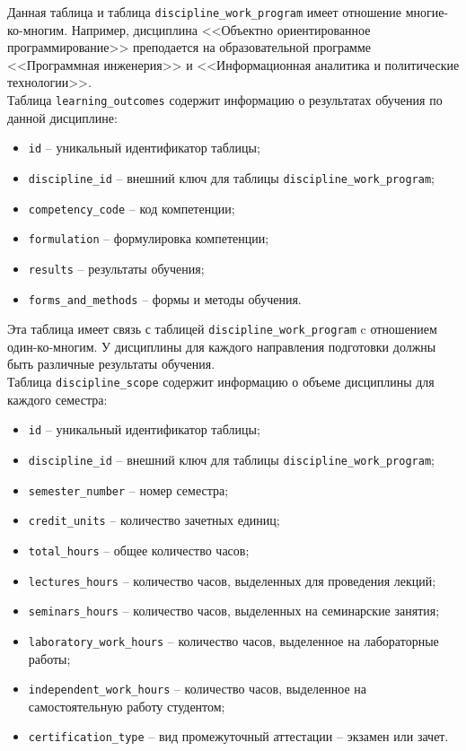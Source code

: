 Данная таблица и таблица \texttt{discipline\_work\_program} имеет отношение многие-ко-многим. Например, дисциплина <<Объектно ориентированное программирование>> преподается на образовательной программе <<Программная инженерия>> и <<Информационная аналитика и политические технологии>>.\\

Таблица \texttt{learning\_outcomes} содержит информацию о результатах обучения по данной дисциплине:

\begin{itemize}
	\item \texttt{id} -- уникальный идентификатор таблицы;
	\item \texttt{discipline\_id} -- внешний ключ для таблицы \texttt{discipline\_work\_program};
	\item \texttt{competency\_code} -- код компетенции;
	\item \texttt{formulation} -- формулировка компетенции;
	\item \texttt{results} -- результаты обучения;
	\item \texttt{forms\_and\_methods} -- формы и методы обучения.
\end{itemize}

Эта таблица имеет связь с таблицей \texttt{discipline\_work\_program} c отношением один-ко-многим. У дисциплины для каждого направления подготовки должны быть различные результаты обучения.\\

Таблица \texttt{discipline\_scope} содержит информацию о объеме дисциплины для каждого семестра:

\begin{itemize}
	\item \texttt{id} -- уникальный идентификатор таблицы;
	\item \texttt{discipline\_id} -- внешний ключ для таблицы \texttt{discipline\_work\_program};
	\item \texttt{semester\_number} -- номер семестра;
	\item \texttt{credit\_units} -- количество зачетных единиц;
	\item \texttt{total\_hours} -- общее количество часов;
	\item \texttt{lectures\_hours} -- количество часов, выделенных для проведения лекций;
	\item \texttt{seminars\_hours} -- количество часов, выделенных на семинарские занятия;
	\item \texttt{laboratory\_work\_hours} -- количество часов, выделенное на лабораторные работы;
	\item \texttt{independent\_work\_hours} -- количество часов, выделенное на самостоятельную работу студентом;
	\item \texttt{certification\_type} -- вид промежуточный аттестации -- экзамен или зачет.
\end{itemize}

